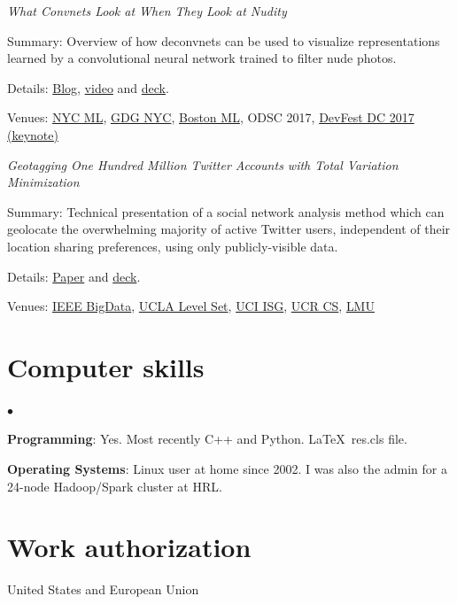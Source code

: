 \documentclass[margin,line]{res}
\newenvironment{list1}{
  \begin{list}{\ding{113}}{%
      \setlength{\itemsep}{0.0in}
      \setlength{\parsep}{0in} \setlength{\parskip}{0in}
      \setlength{\topsep}{0in} \setlength{\partopsep}{0in}
      \setlength{\leftmargin}{0.17in}}}{\end{list}}
\newenvironment{list2}{
  \begin{list}{$\bullet$}{%
      \setlength{\itemsep}{0in}
      \setlength{\parsep}{0in} \setlength{\parskip}{0in}
      \setlength{\topsep}{0in} \setlength{\partopsep}{0in}
      \setlength{\leftmargin}{0.2in}}}{\end{list}}
\begin{document}
\begin{resume}
{\it What Convnets Look at When They Look at Nudity}
\begin{list1}
\item [] Summary: Overview of how deconvnets can be used to visualize representations learned by a convolutional neural network trained to filter nude photos.
\item [] Details: \href{https://web.archive.org/web/20180301204458/http://blog.clarifai.com/what-convolutional-neural-networks-see-at-when-they-see-nudity/}{Blog}, \href{https://www.youtube.com/watch?v=dWgXPKMvxDg}{video} and \href{https://docs.google.com/presentation/d/14SNvMFqyqd3qlKvibc06GkB1lLmDutzcr04uJ_LnX4s/edit#slide=id.g1525123836_1_870}{deck}.
\item [] Venues: \href{https://www.meetup.com/ai-professionals-nyc-machine-learning/events/235535192/}{NYC ML}, \href{https://www.meetup.com/gdgnyc/events/231372185/}{GDG NYC}, \href{https://www.meetup.com/bostonml/events/235419742/}{Boston ML}, ODSC 2017, \href{https://web.archive.org/web/20170516064539/http://www.devfestdc.org:80/speakers/ryan-compton/}{DevFest DC 2017 (keynote)}
\end{list1}

{\it Geotagging One Hundred Million Twitter Accounts with Total Variation Minimization}
\begin{list1}
\item [] Summary: Technical presentation of a social network analysis method which can geolocate the overwhelming majority of active Twitter users, independent of their location sharing preferences, using only publicly-visible data.
\item [] Details: \href{https://arxiv.org/abs/1404.7152}{Paper} and \href{https://ryancompton.net/assets/resume/geolocation_slides_2.pdf}{deck}.
\item [] Venues: \href{https://cci.drexel.edu/bigdata/bigdata2014/}{IEEE BigData}, \href{https://web.archive.org/web/20160322104045/http://papyrus.math.ucla.edu/seminars/display.php?&id=831425}{UCLA Level Set}, \href{https://web.archive.org/web/20160126195041/http://calendar.ics.uci.edu/event.php?calendar=1&category=&event=1386&date=2015-01-16}{UCI ISG}, \href{https://web.archive.org/web/20160317002358/http://wwwcontent.cs.ucr.edu/department/eventlookup/491}{UCR CS}, \href{https://web.archive.org/web/20161019222353/http://myweb.lmu.edu:80/yma/LMUMathSeminar.htm}{LMU}
\end{list1}


\section{\sc Computer skills}
\begin{list2}
\item[]{\bf Programming}: Yes. Most recently C++ and Python. \LaTeX\ res.cls file.
\item[]{\bf Operating Systems}: Linux user at home since 2002. I was also the admin for a 24-node Hadoop/Spark cluster at HRL.
\end{list2}

\section{\sc Work authorization}
United States and European Union

\florilegiumtextend
\end{resume}
\end{document}
